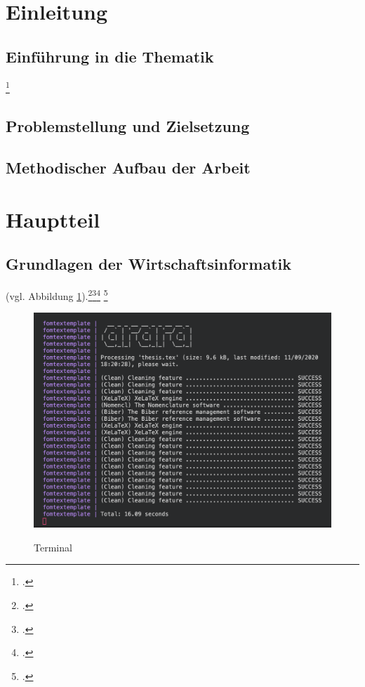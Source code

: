 \section{Einleitung}
\subsection{Einführung in die Thematik}
\blindtext{}
\blindtext\footcite[Vgl. ][]{mswpf}

\subsection{Problemstellung und Zielsetzung}
\blindtext

\subsection{Methodischer Aufbau der Arbeit}
\blindtext

\section{Hauptteil}
\subsection{Grundlagen der Wirtschaftsinformatik}
\blindtext (vgl. Abbildung \ref{abb_bsp}).\footcite[Vgl. ][]{msdatabind}\footcite[Vgl. ][]{Atypisch}\footcite[Vgl. ][34]{Digitaloekonomie}
\blindenumerate
\Blindtext\footcite[Vgl. ][415-426]{Tanenbaum2016}

\begin{figure}[!htb]
    \caption{Terminal}
    \includegraphics[width=1\textwidth]{.github/terminal}
    \captionsetup{width=1\textwidth}
    \label{abb_bsp}
\end{figure}
\blindtext


